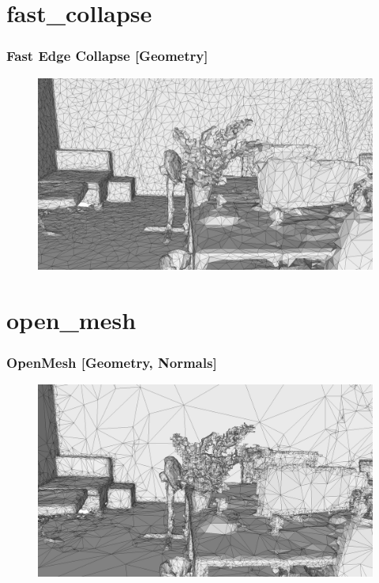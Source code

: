 \documentclass[
	10pt,
	t		%
]{beamer}
\begin{document}
\section{fast_collapse}
\begin{frame}
\frametitle{Fast Edge Collapse [Geometry]}
\begin{figure}[ht]
\centering
\includegraphics[width=1\textwidth]{fast_collapse}
\end{figure}
\end{frame}

\section{open_mesh}
\begin{frame}
\frametitle{OpenMesh [Geometry, Normals]}
\begin{figure}[ht]
\centering
\includegraphics[width=1\textwidth]{open_mesh}
\end{figure}
\end{frame}
\end{document}
